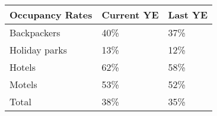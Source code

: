 \begin{tabular}[t]{|p{4.75cm}|p{1.25cm}|p{1.25cm}|}
  \hline
Occupancy Rates & Current YE & Last YE \\ 
  \hline
Backpackers & 40\% & 37\% \\ 
  Holiday parks & 13\% & 12\% \\ 
  Hotels & 62\% & 58\% \\ 
  Motels & 53\% & 52\% \\ 
  Total & 38\% & 35\% \\ 
   \hline
\end{tabular}
